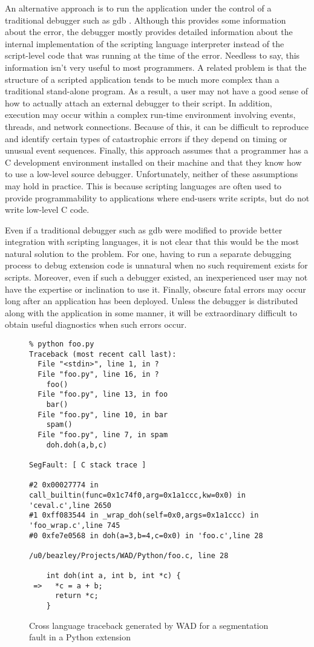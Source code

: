 An alternative approach is to run the application under the control of
a traditional debugger such as gdb \cite{gdb}.  Although this provides
some information about the error, the debugger mostly provides
detailed information about the internal implementation of the
scripting language interpreter instead of the script-level code that
was running at the time of the error.  Needless to say, this information 
isn't very useful to most programmers.
A related problem is that
the structure of a scripted application tends to be much more complex
than a traditional stand-alone program.  As a result, a user may not
have a good sense of how to actually attach an external debugger to their
script.  In addition, execution may occur within a
complex run-time environment involving events, threads, and network
connections.  Because of this, it can be difficult to reproduce
and identify certain types of catastrophic errors if they depend on
timing or unusual event sequences. Finally, this approach
assumes that a programmer has a C development environment installed on
their machine and that they know how to use a low-level source
debugger.  Unfortunately, neither of these assumptions may hold in practice.
This is because scripting languages are often used to provide programmability to
applications where end-users write scripts, but do not write low-level C code.

Even if a traditional debugger such as gdb were modified to provide
better integration with scripting languages, it is not clear that this
would be the most natural solution to the problem.  For one, 
having to run a separate debugging process to debug
extension code is unnatural when no such requirement exists for
scripts.  Moreover, even if such a debugger existed, an
inexperienced user may not have the expertise or inclination to use
it.  Finally, obscure fatal errors may occur long after an application
has been deployed.  Unless the debugger is distributed along with the
application in some manner, it will be extraordinary difficult to
obtain useful diagnostics when such errors occur.

\begin{figure*}[t]
{\small
\begin{verbatim}
% python foo.py
Traceback (most recent call last):
  File "<stdin>", line 1, in ?
  File "foo.py", line 16, in ?
    foo()
  File "foo.py", line 13, in foo
    bar()
  File "foo.py", line 10, in bar
    spam()
  File "foo.py", line 7, in spam
    doh.doh(a,b,c)

SegFault: [ C stack trace ]

#2 0x00027774 in call_builtin(func=0x1c74f0,arg=0x1a1ccc,kw=0x0) in 'ceval.c',line 2650
#1 0xff083544 in _wrap_doh(self=0x0,args=0x1a1ccc) in 'foo_wrap.c',line 745
#0 0xfe7e0568 in doh(a=3,b=4,c=0x0) in 'foo.c',line 28

/u0/beazley/Projects/WAD/Python/foo.c, line 28

    int doh(int a, int b, int *c) {
 =>   *c = a + b;
      return *c;
    }
\end{verbatim}
}
\caption{Cross language traceback generated by WAD for a segmentation fault in a Python extension}
\end{figure*}

